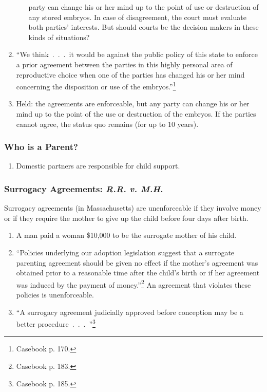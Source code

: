 \begin{enumerate}
\begin{enumerate}
        party can change his or her mind up to the point of use or destruction 
        of any stored embryos. In case of disagreement, the court must 
        evaluate both parties' interests. But should courts be the decision 
        makers in these kinds of situations?
    \end{enumerate}
    \item ``We think~.~.~.~it would be against the public policy of this state 
    to enforce a prior agreement between the parties in this highly personal 
    area of reproductive choice when one of the parties has changed his or her 
    mind concerning the disposition or use of the embryos.''\footnote{Casebook 
    p. 170.}
    \item Held: the agreements are enforceable, but any party can change his 
    or her mind up to the point of the use or destruction of the embryos. If 
    the parties cannot agree, the status quo remains (for up to 10 years).
\end{enumerate}

\subsubsection{Who is a Parent?}

\begin{enumerate}
    \item Domestic partners are responsible for child support.
\end{enumerate}

\subsubsection{Surrogacy Agreements: \emph{R.R. v. M.H.}}

Surrogacy agreements (in Massachusetts) are unenforceable if they involve 
money or if they require the mother to give up the child before four days 
after birth.

\begin{enumerate}
    \item A man paid a woman \$10,000 to be the surrogate mother of his child.
    \item ``Policies underlying our adoption legislation suggest that a 
    surrogate parenting agreement should be given no effect if the mother's 
    agreement was obtained prior to a reasonable time after the child's birth 
    or if her agreement was induced by the payment of 
    money.''\footnote{Casebook p. 183.} An agreement that violates these 
    policies is unenforceable.
    \item ``A surrogacy agreement judicially approved before conception may be 
    a better procedure~.~.~.~''\footnote{Casebook p. 185.}
\end{enumerate}

